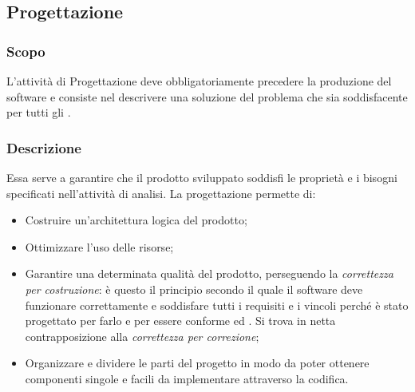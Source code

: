 \documentclass[../NomeDocumento.tex]{subfiles}
\begin{document}
\subsection{Progettazione} 

	\subsubsection{Scopo} 

	L'attività di Progettazione deve obbligatoriamente precedere la produzione del software e consiste nel descrivere una soluzione del problema che sia soddisfacente per tutti gli .
	
	\subsubsection{Descrizione}
	
	Essa serve a garantire che il prodotto sviluppato soddisfi le proprietà e i bisogni specificati nell'attività di analisi. La progettazione permette di:
	
	\begin{itemize}
		\item Costruire un’architettura logica del prodotto;
		\item Ottimizzare l’uso delle risorse;
		\item Garantire una determinata qualità del prodotto, perseguendo la \textit{correttezza per costruzione}: è questo il principio secondo il quale il software deve funzionare correttamente e soddisfare tutti i requisiti e i vincoli perché è stato progettato per farlo e per essere conforme ed . Si trova in netta contrapposizione alla \textit{correttezza per
		correzione};
		\item Organizzare e dividere le parti del progetto in modo da poter ottenere componenti singole e facili da implementare attraverso la codifica. 
	\end{itemize}
\end{document}
